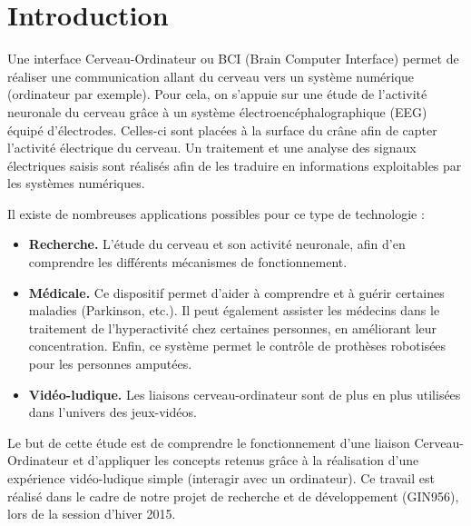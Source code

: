 \chapter* {Introduction}
\thispagestyle{fancy}

Une interface Cerveau-Ordinateur ou BCI (Brain Computer Interface) permet de réaliser une communication allant du cerveau vers un système numérique (ordinateur par exemple). Pour cela, on s'appuie sur une étude de l'activité neuronale du cerveau grâce à un système électroencéphalographique (EEG) équipé d'électrodes. Celles-ci sont placées à la surface du crâne afin de capter l'activité électrique du cerveau. Un traitement et une analyse des signaux électriques saisis sont réalisés afin de les traduire en informations exploitables par les systèmes numériques. 

Il existe de nombreuses applications possibles pour ce type de technologie : 

\smallbreak

\begin{itemize}
	\item \textbf{Recherche.} L'étude du cerveau et son activité neuronale, afin d'en comprendre les différents mécanismes de fonctionnement.
	\smallbreak
	\item \textbf{Médicale.} Ce dispositif permet d'aider à comprendre et à guérir certaines maladies (Parkinson, etc.). Il peut également assister les médecins dans le traitement de l'hyperactivité chez certaines personnes, en améliorant leur concentration. Enfin, ce système permet le contrôle de prothèses robotisées pour les personnes amputées.
	\smallbreak
	\item \textbf{Vidéo-ludique.} Les liaisons cerveau-ordinateur sont de plus en plus utilisées dans l'univers des jeux-vidéos. 
\end{itemize}

\smallbreak

Le but de cette étude est de comprendre le fonctionnement d'une liaison Cerveau-Ordinateur et d'appliquer les concepts retenus grâce à la réalisation d'une expérience vidéo-ludique simple (interagir avec un ordinateur). Ce travail est réalisé dans le cadre de notre projet de recherche et de développement (GIN956), lors de la session d'hiver 2015.

